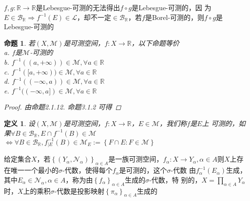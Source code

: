 \documentclass[12pt, a4paper, oneside]{ctexbook}
\newtheorem{definition}[theorem]{定义}
\newtheorem{proposition}[theorem]{命题}
\begin{document}
$f,g:\mathbb{R}\to\mathbb{R}$是Lebesgue-可测的无法得出$f\circ g$是Lebesgue-可测的，因
为$E\in\mathcal{B}_{\mathbb{R}}\Rightarrow f^{-1}(E)\in\mathcal{L}$，却不一定$\in\mathcal{B}_{\mathbb{R}}$，若$f$是Borel-可测的，则$f\circ 
g$是Lebesgue-可测的
\begin{proposition}
    若$(X,\mathcal{M})$是可测空间，$f:X\to\mathbb{R}$，以下命题等价\\
    a. $f$是$\mathcal{M}$-可测的\\
    b. $f^{-1}((a,+\infty))\in\mathcal{M},\forall a\in\mathbb{R}$\\
    c. $f^{-1}([a,+\infty))\in\mathcal{M},\forall a\in\mathbb{R}$\\
    d. $f^{-1}((-\infty,a))\in\mathcal{M},\forall a\in\mathbb{R}$\\
    e. $f^{-1}((-\infty,a])\in\mathcal{M},\forall a\in\mathbb{R}$\\
    \begin{proof}
        由命题2.1.12. 命题3.1.2 可得
    \end{proof}
\end{proposition}
\begin{definition}
    设$(X,\mathcal{M})$是可测空间，$f:X\to\mathbb{R}$，$E\in\mathcal{M}$，我们称$f$是$E$上
    可测的，如果$\forall B\in\mathcal{B}_{\mathbb{R}},E\cap f^{-1}(B)\in\mathcal{M}$\\
    $\Leftrightarrow \forall B\in\mathcal{B}_{\mathbb{R}},f_{|E}^{-1}(B)\in\mathcal{M}_E:=\left\{F\cap E:F\in\mathcal{M}\right\}$
\end{definition}
给定集合$X$，若$\left\{(Y_{\alpha},\mathcal{N}_{\alpha})\right\}_{\alpha\in A}$是一族可测空间，$f_{\alpha}:X\to Y_{\alpha},\alpha\in 
A$则$X$上存在唯一一个最小的$\sigma$-代数，使得每个$f_{\alpha}$是可测的，这个$\sigma$-代数
由$f_{\alpha}^{-1}(E_{\alpha})$生成，其中$E_{\alpha}\in\mathcal{N}_{\alpha},\alpha\in A$，称为由$\left\{f_{\alpha}\right\}_{\alpha\in A}$生成的$\sigma$-代数，特
别的，$X=\prod_{\alpha\in A}Y_{\alpha}$时，$X$上的乘积$\sigma$-代数是投影映射$\left\{\pi_{\alpha}\right\}_{\alpha\in A}$生成的
\end{document}
